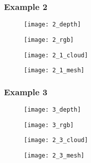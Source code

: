 \subsubsection{Example 2}

\begin{figure}[H]
\centering
\begin{minipage}{0.45\textwidth}
\texttt{[image: 2\_depth]}
\end{minipage}
\begin{minipage}{0.45\textwidth}
\texttt{[image: 2\_rgb]}
\end{minipage}
\begin{minipage}{0.45\textwidth}
\texttt{[image: 2\_1\_cloud]}
\end{minipage}
\begin{minipage}{0.45\textwidth}
\texttt{[image: 2\_1\_mesh]}
\end{minipage}
\end{figure}


\subsubsection{Example 3}

\begin{figure}[H]
\centering
\begin{minipage}{0.45\textwidth}
\texttt{[image: 3\_depth]}
\end{minipage}
\begin{minipage}{0.45\textwidth}
\texttt{[image: 3\_rgb]}
\end{minipage}
\begin{minipage}{0.45\textwidth}
\texttt{[image: 2\_3\_cloud]}
\end{minipage}
\begin{minipage}{0.45\textwidth}
\texttt{[image: 2\_3\_mesh]}
\end{minipage}
\end{figure}